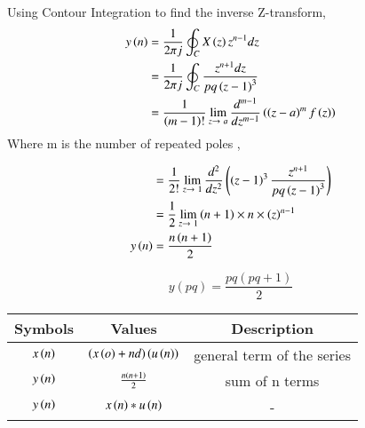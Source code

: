 \documentclass[a4,12pt,twocolumn]{IEEEtran}
\begin{document}
Using Contour Integration to find the inverse Z-transform,
\begin{align}
y\left(n\right) &= \frac{1}{2\pi j}\oint_C X\left(z\right)z^{n-1}dz \\
&= \frac{1}{2\pi j}\oint_C \frac{z^{n+1}dz}{pq\left(z-1\right)^3} \\
&= \frac{1}{\left(m-1\right)!} \lim_{z\to\ a}\frac{d^{m-1}}{dz^{m-1}} \left(\left(z-a\right)^m f\left(z\right)\right) 
\end{align}
Where m is the number of repeated poles ,

\begin{align}
&= \frac{1}{2!} \lim_{z\to\ 1}\frac{d^2}{dz^2} \left(\left(z-1\right)^3 \frac{z^{n+1}}{pq\left(z-1\right)^3}\right) \\
&= \frac{1}{2} \lim_{z\to\ 1} \left(n+1\right) \times n \times \left(z\right)^{n-1}\\
y\left(n\right) &= \frac{n\left(n+1\right)}{2}
\end{align}

\begin{equation}
\boxed{
y(pq) = \frac{pq(pq+1)}{2}
}
\end{equation}

\begin{tabular}{|c|c|c|}
    \hline
    \textbf{Symbols} & \textbf{Values} & \textbf{Description} \\
    \hline
    $x\left(n\right)$ & $\left(x\left(o\right) + nd\right)\left(u\left(n\right)\right)$ & general term of the series \\
    \hline
    $y\left(n\right)$ & $ \frac{n\left(n+1\right)}{2}$ & sum of n terms \\
    \hline
    $y\left(n\right)$ & $x\left(n\right) * u\left(n\right)$ & - \\
    \hline
\end{tabular}\\
\end{document}
